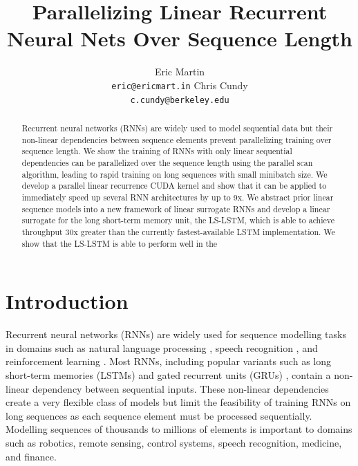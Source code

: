 \documentclass{article}
\title{Parallelizing Linear Recurrent Neural Nets Over Sequence Length}
\author{
  Eric Martin \\%
  \texttt{eric@ericmart.in}
  \And
  Chris Cundy \\
  \texttt{c.cundy@berkeley.edu}
}
\begin{document}

\maketitle

\begin{abstract}
Recurrent neural networks (RNNs) are widely used to model sequential data but
their non-linear dependencies between sequence elements prevent parallelizing
training over sequence length. We show the training of RNNs with only linear
sequential dependencies can be parallelized over the sequence length using the
parallel scan algorithm, leading to rapid training on long sequences with small
minibatch size. We develop a parallel linear recurrence CUDA kernel and show
that it can be applied to immediately speed up several RNN architectures by up
to 9x. We abstract prior linear sequence models into a new framework of linear
surrogate RNNs and develop a linear surrogate for the long short-term memory 
unit, the LS-LSTM, which is able to achieve throughput 30x greater than the
currently fastest-available LSTM implementation. We show that the LS-LSTM is
able to perform well in the 
\end{abstract}

\section{Introduction}

Recurrent neural networks (RNNs) are widely used for sequence modelling tasks in domains such as 
natural language processing \cite{sutskever2014sequence}, 
speech recognition \cite{amodei2015deep},
and reinforcement learning \cite{hausknecht2015deep}. Most RNNs, including popular variants such as long short-term memories (LSTMs) \cite{hochreiter1997long} and gated recurrent units (GRUs) \cite{cho2014learning}, contain a non-linear dependency
between sequential inputs. These non-linear dependencies create a very flexible class of
models but limit the feasibility of training RNNs on long sequences as each sequence element
must be processed sequentially.
Modelling sequences of thousands to millions of elements is important to domains
such as robotics, remote sensing, control systems, speech recognition, medicine, and finance.
\end{document}
